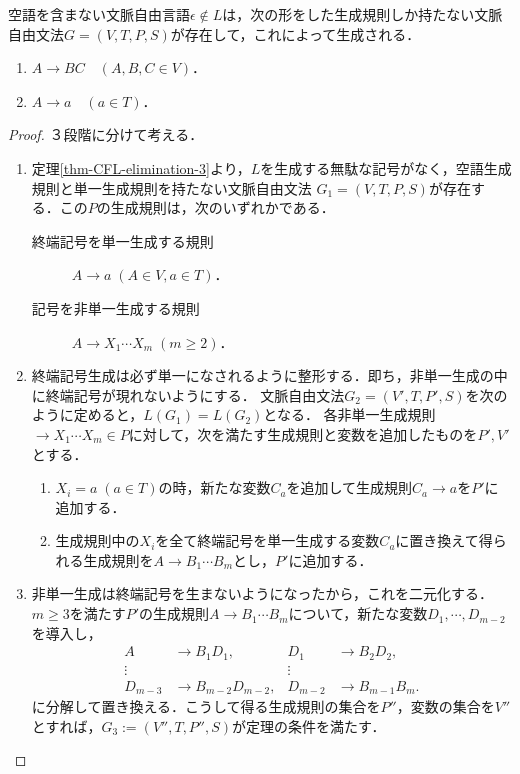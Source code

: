 \begin{theorem}\label{thm-Chomsky-normal-form}
    空語を含まない文脈自由言語$\epsilon\notin L$は，次の形をした生成規則しか持たない文脈自由文法$G=(V,T,P,S)$が存在して，これによって生成される．
    \begin{enumerate}
        \item $A\to BC\quad(A,B,C\in V)$．
        \item $A\to a\quad(a\in T)$．
    \end{enumerate}
\end{theorem}
\begin{proof}３段階に分けて考える．
    \begin{enumerate}
        \item 定理\ref{thm-CFL-elimination-3}より，$L$を生成する無駄な記号がなく，空語生成規則と単一生成規則を持たない文脈自由文法
        $G_1=(V,T,P,S)$が存在する．この$P$の生成規則は，次のいずれかである．
        \begin{description}
            \item[終端記号を単一生成する規則] $A\to a\;(A\in V,a\in T)$．
            \item[記号を非単一生成する規則] $A\to X_1\cdots X_m\;(m\ge 2)$．
        \end{description}
        \item 終端記号生成は必ず単一になされるように整形する．即ち，非単一生成の中に終端記号が現れないようにする．
        文脈自由文法$G_2=(V',T,P',S)$を次のように定めると，$L(G_1)=L(G_2)$となる．
        各非単一生成規則$\to X_1\cdots X_m\in P$に対して，次を満たす生成規則と変数を追加したものを$P',V'$とする．
        \begin{enumerate}[(1)]
            \item $X_i=a\;(a\in T)$の時，新たな変数$C_a$を追加して生成規則$C_a\to a$を$P'$に追加する．
            \item 生成規則中の$X_i$を全て終端記号を単一生成する変数$C_a$に置き換えて得られる生成規則を$A\to B_1\cdots B_m$とし，$P'$に追加する．
        \end{enumerate}
        \item 非単一生成は終端記号を生まないようになったから，これを二元化する．$m\ge 3$を満たす$P'$の生成規則$A\to B_1\cdots B_m$について，新たな変数$D_1,\cdots,D_{m-2}$を導入し，
        \begin{align*}
            A&\to B_1D_1,&D_1&\to B_2D_2,\\
            \vdots&&\vdots\\
            D_{m-3}&\to B_{m-2}D_{m-2},&D_{m-2}&\to B_{m-1}B_m.
        \end{align*}
        に分解して置き換える．こうして得る生成規則の集合を$P''$，変数の集合を$V''$とすれば，$G_3:=(V'',T,P'',S)$が定理の条件を満たす．
    \end{enumerate}
\end{proof}

